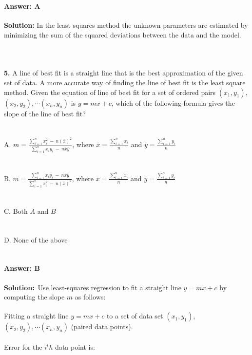 \documentclass[prl,twocolumn,showpacs,preprintnumbers,superscriptaddress]{revtex4}
\theoremstyle{plain}
\theoremstyle{definition}
\begin{document}
\begin{widetext}
\\
\\
\textbf{Answer: A}
\\
\\
\textbf{Solution:}
In the least squares method the unknown parameters are estimated by minimizing the sum of the squared deviations between the data and the model. 
\\
\\
\\
\\
\noindent\textbf{5.} A line of best fit is a straight line that is the best approximation of the given set of data. A more accurate way of finding the line of best fit is the least square method. Given the equation of line of best fit for a set of ordered pairs $(x_{1},y_{1})$, $ (x_{2},y_{2}), \cdots (x_{n},y_{n})$ is $y = mx + c$, which of the following formula gives the slope of the line of best fit?
\\
\\
\\
\noindent A. $m = \frac{\sum_{i=1}^n x_{i}^2 \  - \  n(\bar x)^2}{\sum_{i=1}^n x_{i}y_{i} \  -  \ n\bar x\bar y}$, where $\bar x = \frac{\sum_{i=1}^nx_{i}}{n}$ and $\bar y = \frac{\sum_{i=1}^ny_{i}}{n}$
\\
\\
\\
B. $m = \frac{\sum_{i=1}^n x_{i}y_{i} \  - \  n\bar x\bar y}{\sum_{i=1}^n x_{i}^2 \  - \  n(\bar x)^2}$, where $\bar x = \frac{\sum_{i=1}^nx_{i}}{n}$ and $\bar y = \frac{\sum_{i=1}^ny_{i}}{n}$
\\
\\
\\
C. Both $A$ and $B$
\\
\\
\\
D. None of the above
\\
\\
\\
\textbf{Answer: B}
\\
\\
\textbf{Solution:}\ 
Use least-squares regression to fit a straight line $y = mx + c$ by computing the slope $m$ as follows:
\\
\\
Fitting a straight line $y = mx + c$ to a set of data set $(x_{1},y_{1})$, $ (x_{2},y_{2}), \cdots (x_{n},y_{n})$ (paired data points).
\\
\\
Error for the $i^th$ data point is:

\end{widetext}
\end{document}
